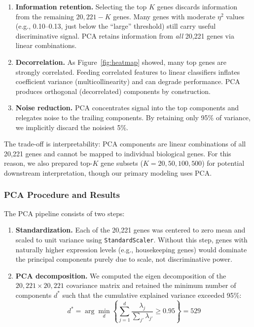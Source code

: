 \documentclass{article}
\begin{document}
\begin{enumerate}[leftmargin=2em]
\item \textbf{Information retention.} Selecting the top $K$ genes discards information from the remaining $20{,}221 - K$ genes. Many genes with moderate $\eta^2$ values (e.g., 0.10--0.13, just below the ``large'' threshold) still carry useful discriminative signal. PCA retains information from \textit{all} 20{,}221 genes via linear combinations.

\item \textbf{Decorrelation.} As Figure~\ref{fig:heatmap} showed, many top genes are strongly correlated. Feeding correlated features to linear classifiers inflates coefficient variance (multicollinearity) and can degrade performance. PCA produces orthogonal (decorrelated) components by construction.

\item \textbf{Noise reduction.} PCA concentrates signal into the top components and relegates noise to the trailing components. By retaining only 95\% of variance, we implicitly discard the noisiest 5\%.
\end{enumerate}

The trade-off is interpretability: PCA components are linear combinations of all 20{,}221 genes and cannot be mapped to individual biological genes. For this reason, we also prepared top-$K$ gene subsets ($K = 20, 50, 100, 500$) for potential downstream interpretation, though our primary modeling uses PCA.

\subsubsection{PCA Procedure and Results}
The PCA pipeline consists of two steps:
\begin{enumerate}[leftmargin=2em]
\item \textbf{Standardization.} Each of the 20{,}221 genes was centered to zero mean and scaled to unit variance using \texttt{StandardScaler}. Without this step, genes with naturally higher expression levels (e.g., housekeeping genes) would dominate the principal components purely due to scale, not discriminative power.

\item \textbf{PCA decomposition.} We computed the eigen decomposition of the $20{,}221 \times 20{,}221$ covariance matrix and retained the minimum number of components $d^*$ such that the cumulative explained variance exceeded 95\%:
\[
d^* = \arg\min_d \left\{ \sum_{j=1}^{d} \frac{\lambda_j}{\sum_{j'} \lambda_{j'}} \ge 0.95 \right\} = 529
\]
\end{enumerate}
\end{document}
